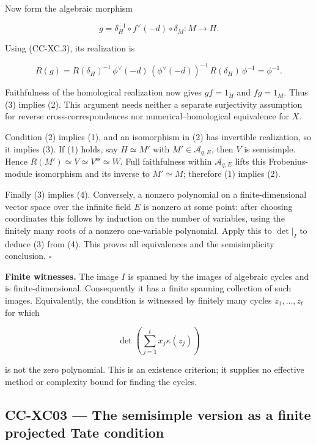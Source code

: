 \documentclass[11pt,a4paper]{article}
\theoremstyle{definition}\newtheorem{definition}[theorem]{Definition}
\theoremstyle{remark}\newtheorem{remark}[theorem]{Remark}
\begin{document}
Now form the algebraic morphism

\[
 g=\delta_H^{-1}\circ f^\vee(-d)\circ\delta_M:
          M\longrightarrow H.                    \tag{CC-XC.4}
\]

Using (CC-XC.3), its realization is

\[
 R(g)=R(\delta_H)^{-1}\,
       \phi^\vee(-d)\,
       (\phi^\vee(-d))^{-1}\,
       R(\delta_H)\,\phi^{-1}
       =\phi^{-1}.
\]

Faithfulness of the homological realization now gives \(gf=1_H\) and
\(fg=1_M\). Thus (3) implies (2). This argument needs neither a separate
surjectivity assumption for reverse cross-correspondences nor
numerical--homological equivalence for \(X\).

Condition (2) implies (1), and an isomorphism in (2) has invertible
realization, so it implies (3). If (1) holds, say \(H\simeq M'\) with
\(M'\in\mathcal A_{q,E}\), then \(V\) is semisimple. Hence
\(R(M')\simeq V\simeq V^{\mathrm{ss}}\simeq W\). Full faithfulness
within \(\mathcal A_{q,E}\) lifts this Frobenius-module isomorphism and
its inverse to \(M'\simeq M\); therefore (1) implies (2).

Finally (3) implies (4). Conversely, a nonzero polynomial on a
finite-dimensional vector space over the infinite field \(E\) is nonzero
at some point: after choosing coordinates this follows by induction on
the number of variables, using the finitely many roots of a nonzero
one-variable polynomial. Apply this to \(\det|_I\) to deduce (3) from
(4). This proves all equivalences and the semisimplicity conclusion.
\(\square\)

\textbf{Finite witnesses.} The image \(I\) is spanned by the images of
algebraic cycles and is finite-dimensional. Consequently it has a finite
spanning collection of such images. Equivalently, the condition is
witnessed by finitely many cycles \(z_1,\ldots,z_t\) for which

\[
 \det\!\left(\sum_{j=1}^t x_j\kappa(z_j)\right)
\]

is not the zero polynomial. This is an existence criterion; it supplies
no effective method or complexity bound for finding the cycles.

\subsection{CC-XC03 --- The semisimple version as a finite projected
Tate
condition}\label{cc-xc03-the-semisimple-version-as-a-finite-projected-tate-condition}
\end{document}
